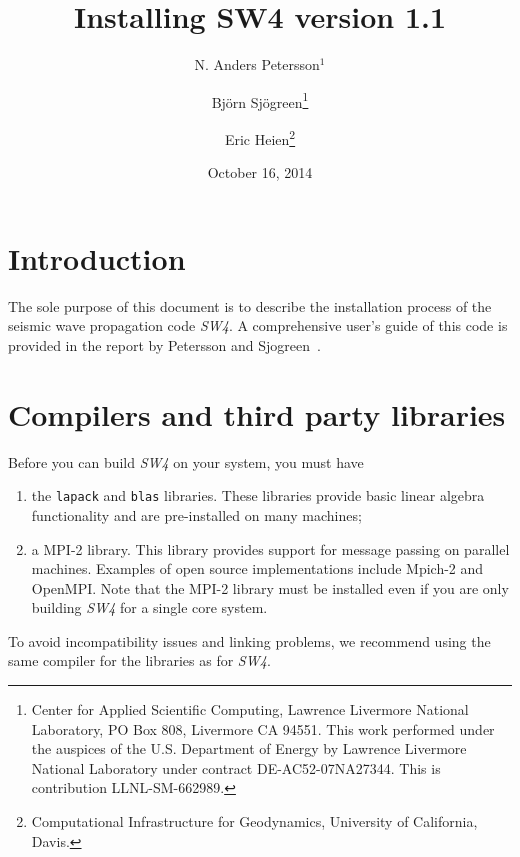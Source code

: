 \documentclass[11pt]{article}
\begin{document}
\title{Installing SW4 version 1.1}

\author{ N. Anders Petersson$^1$ \and Bj\"orn Sj\"ogreen\thanks{Center for Applied Scientific
    Computing, Lawrence Livermore National Laboratory, PO Box 808, Livermore CA 94551. This work
    performed under the auspices of the U.S. Department of Energy by Lawrence Livermore National
    Laboratory under contract DE-AC52-07NA27344. This is contribution LLNL-SM-662989.} \and Eric
  Heien\thanks{Computational Infrastructure for Geodynamics, University of California, Davis.}}
\date{October 16, 2014} \maketitle




\tableofcontents

\section{Introduction}
The sole purpose of this document is to describe the installation process of the seismic wave
propagation code \emph{SW4}. A comprehensive user's guide of this code is provided in the report by
Petersson and Sjogreen~\cite{SW4-11}.

\section{Compilers and third party libraries}

Before you can build \emph{SW4} on your system, you must have
\begin{enumerate}
\item the \verb+lapack+ and \verb+blas+ libraries. These libraries provide basic linear algebra
  functionality and are pre-installed on many machines;
\item a MPI-2 library. This library provides support for message passing on parallel
  machines. Examples of open source implementations include Mpich-2 and OpenMPI. Note that the MPI-2
  library must be installed even if you are only building \emph{SW4} for a single core system.
\end{enumerate}
To avoid incompatibility issues and linking problems, we recommend using the same compiler for
the libraries as for \emph{SW4}.
\end{document}
